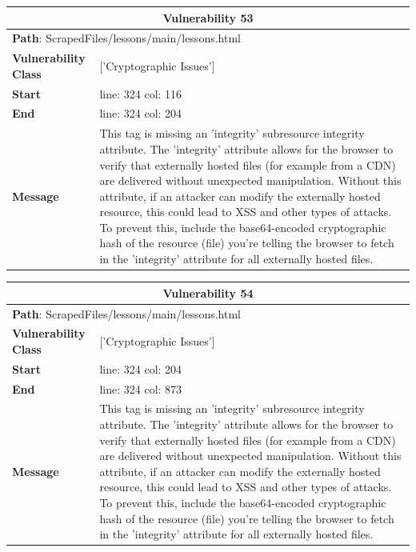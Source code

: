 \documentclass[12pt]{article}
\begin{document}
\vspace{0.7cm}
\FloatBarrier
\begin{table}[!h]
\centering
\renewcommand{\arraystretch}{1.3}
\begin{tabular}{|l|p{10cm}|}
\hline
\multicolumn{2}{|c|}{\textbf{Vulnerability 53}} \\
\hline
\multicolumn{2}{|l|}{\textbf{Path}: ScrapedFiles/lessons/main/lessons.html} \\
\hline
\textbf{Vulnerability Class} & ['Cryptographic Issues'] \\
\hline
\textbf{Start} & line: 324 \quad col: 116 \\
\hline
\textbf{End} & line: 324 \quad col: 204 \\
\hline
\textbf{Message} & This tag is missing an 'integrity' subresource integrity attribute. The 'integrity' attribute allows for the browser to verify that externally hosted files (for example from a CDN) are delivered without unexpected manipulation. Without this attribute, if an attacker can modify the externally hosted resource, this could lead to XSS and other types of attacks. To prevent this, include the base64-encoded cryptographic hash of the resource (file) you're telling the browser to fetch in the 'integrity' attribute for all externally hosted files. \\
\hline
\end{tabular}
\end{table}
\vspace{0.7cm}
\FloatBarrier
\begin{table}[!h]
\centering
\renewcommand{\arraystretch}{1.3}
\begin{tabular}{|l|p{10cm}|}
\hline
\multicolumn{2}{|c|}{\textbf{Vulnerability 54}} \\
\hline
\multicolumn{2}{|l|}{\textbf{Path}: ScrapedFiles/lessons/main/lessons.html} \\
\hline
\textbf{Vulnerability Class} & ['Cryptographic Issues'] \\
\hline
\textbf{Start} & line: 324 \quad col: 204 \\
\hline
\textbf{End} & line: 324 \quad col: 873 \\
\hline
\textbf{Message} & This tag is missing an 'integrity' subresource integrity attribute. The 'integrity' attribute allows for the browser to verify that externally hosted files (for example from a CDN) are delivered without unexpected manipulation. Without this attribute, if an attacker can modify the externally hosted resource, this could lead to XSS and other types of attacks. To prevent this, include the base64-encoded cryptographic hash of the resource (file) you're telling the browser to fetch in the 'integrity' attribute for all externally hosted files. \\
\hline
\end{tabular}
\end{table}
\end{document}
